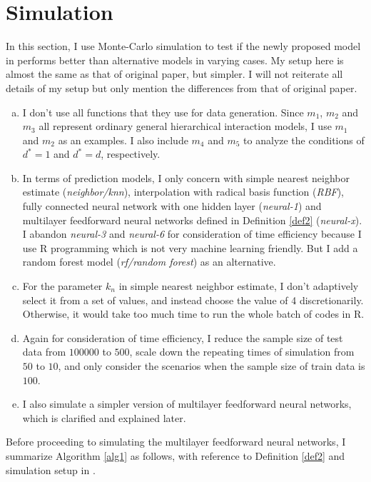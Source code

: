 \section{Simulation}
\label{sec:simulation}

In this section, I use Monte-Carlo simulation to test if the newly proposed model in \cite{Bauer2019} performs better than alternative models in varying cases. My setup here is almost the same as that of original paper, but simpler. I will not reiterate all details of my setup but only mention the differences from that of original paper.

\begin{enumerate}[(a)]
    \item I don't use all functions that they use for data generation. Since $m_1$, $m_2$ and $m_3$ all represent ordinary general hierarchical interaction models, I use $m_1$ and $m_2$ as an examples. I also include $m_4$ and $m_5$ to analyze the conditions of $d^*=1$ and $d^*=d$, respectively.
    \item In terms of prediction models, I only concern with simple nearest neighbor estimate (\textit{neighbor/knn}), interpolation with radical basis function (\textit{RBF}), fully connected neural network with one hidden layer (\textit{neural-1}) and multilayer feedforward neural networks defined in Definition \ref{def2} (\textit{neural-x}). I abandon \textit{neural-3} and \textit{neural-6} for consideration of time efficiency because I use R programming which is not very machine learning friendly. But I add a random forest model (\textit{rf/random forest}) as an alternative.
    \item For the parameter $k_n$ in simple nearest neighbor estimate, I don't adaptively select it from a set of values, and instead choose the value of 4 discretionarily. Otherwise, it would take too much time to run the whole batch of codes in R.
    \item Again for consideration of time efficiency, I reduce the sample size of test data from $100000$ to $500$, scale down the repeating times of simulation from $50$ to $10$, and only consider the scenarios when the sample size of train data is $100$.
    \item I also simulate a simpler version of multilayer feedforward neural networks, which is clarified and explained later.
\end{enumerate}

Before proceeding to simulating the multilayer feedforward neural networks, I summarize Algorithm \ref{alg1} as follows, with reference to Definition \ref{def2} and simulation setup in \cite{Bauer2019}.

